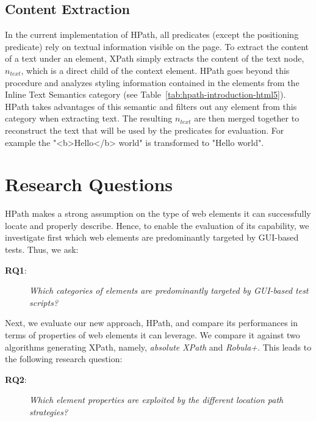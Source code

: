 \subsection{Content Extraction}
\label{sec:hpath-hpath-text-extraction}

In the current implementation of HPath, all predicates (except the positioning predicate) rely on textual information visible on the page. To extract the content of a text under an element, XPath simply extracts the content of the text node, $n_{text}$, which is a direct child of the context element. HPath goes beyond this procedure and analyzes styling information contained in the elements from the Inline Text Semantics category (see Table~\ref{tab:hpath-introduction-html5}). HPath takes advantages of this semantic and filters out any element from this category when extracting text. The resulting $n_{text}$ are then merged together to reconstruct the text that will be used by the predicates for evaluation. For example the "<b>Hello</b> world" is transformed to "Hello world".

\section{Research Questions}
\label{sec:hpath-rqs}

HPath makes a strong assumption on the type of web elements it can successfully locate and properly describe. Hence, to enable the evaluation of its capability, we investigate first which web elements are predominantly targeted by GUI-based tests. Thus, we ask:

\begin{description} 
\item[\textbf{RQ1}:]
\emph{Which categories of elements are predominantly targeted by GUI-based test scripts?} 
\end{description} 

Next, we evaluate our new approach, HPath, and compare its performances in terms of properties of web elements it can leverage. We compare it against two algorithms generating XPath, namely, \emph{absolute XPath} and \emph{Robula+}. This leads to the following research question:

\begin{description} 
\item[\textbf{RQ2}:]
\emph{Which element properties are exploited by the different location path strategies?} 
\end{description} 
        
